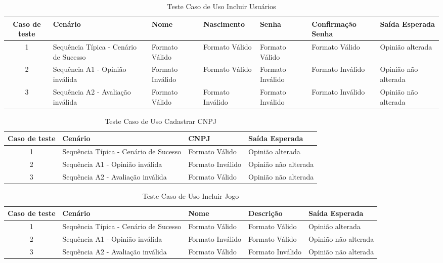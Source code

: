 \documentclass[a4paper,11pt]{article}
\begin{document}
	\begin{center}
	\begin{table}[H]
		\begin{tabularx}{\textwidth}{|c|X|X|X|X|X|X|} \hline
			\textbf{Caso de teste} & \textbf{Cenário} & \textbf{Nome} & \textbf{Nascimento} & \textbf{Senha} & \textbf{Confirmação Senha} & \textbf{Saída Esperada} \\
			\hline
			1 & Sequência Típica - Cenário de Sucesso & Formato Válido & Formato Válido & Formato Válido & Formato Válido & Opinião alterada\\ \hline
			2 & Sequência A1 - Opinião inválida & Formato Inválido & Formato Válido & Formato Inválido & Formato Inválido & Opinião não alterada\\ \hline
			3 & Sequência A2 - Avaliação inválida & Formato Válido & Formato Inválido & Formato Inválido & Formato Inválido & Opinião não alterada\\ \hline
			
		\end{tabularx}
		\caption{Teste Caso de Uso Incluir Usuários}
	\end{table}
	\end{center}
	
	\begin{center}
	\begin{table}[H]
		\begin{tabularx}{\textwidth}{|c|X|X|X|} \hline
			\textbf{Caso de teste} & \textbf{Cenário} & \textbf{CNPJ} & \textbf{Saída Esperada} \\
			\hline
			1 & Sequência Típica - Cenário de Sucesso & Formato Válido & Opinião alterada\\ \hline
			2 & Sequência A1 - Opinião inválida & Formato Inválido & Opinião não alterada\\ \hline
			3 & Sequência A2 - Avaliação inválida & Formato Válido & Opinião não alterada\\ \hline
			
		\end{tabularx}
		\caption{Teste Caso de Uso Cadastrar CNPJ}
	\end{table}
	\end{center}
	
	\begin{center}
	\begin{table}[H]
		\begin{tabularx}{\textwidth}{|c|X|X|X|X|} \hline
			\textbf{Caso de teste} & \textbf{Cenário} & \textbf{Nome} & \textbf{Descrição} & \textbf{Saída Esperada} \\
			\hline
			1 & Sequência Típica - Cenário de Sucesso & Formato Válido & Formato Válido & Opinião alterada\\ \hline
			2 & Sequência A1 - Opinião inválida & Formato Inválido & Formato Válido & Opinião não alterada\\ \hline
			3 & Sequência A2 - Avaliação inválida & Formato Válido & Formato Inválido & Opinião não alterada\\ \hline
			
		\end{tabularx}
		\caption{Teste Caso de Uso Incluir Jogo}
	\end{table}
	\end{center}
	
\end{document}
